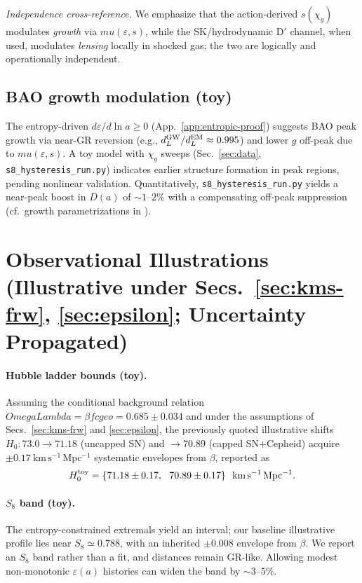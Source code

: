 \documentclass[aps,prd,onecolumn,superscriptaddress,nofootinbib]{revtex4-2}
\def\OmL{OmegaLambda}%
\def\cgeo{cgeo}%
\def\mu{mu}%
\def\Omega_\Lambda{OmegaLambda}%
\providecommand{\OmL}{\Omega_\Lambda}
\providecommand{\cgeo}{c_{\rm geo}}
\providecommand{\be}{\begin{equation}}
\providecommand{\ee}{\end{equation}}
\begin{document}
\noindent\emph{Independence cross-reference.} We emphasize that the action‑derived $s(\chi_g)$ modulates \emph{growth} via $\mu(\varepsilon,s)$, while the SK/hydrodynamic D$'$ channel, when used, modulates \emph{lensing} locally in shocked gas; the two are logically and operationally independent.

\subsection{BAO growth modulation (toy)}
The entropy-driven \(d\varepsilon/d\ln a \geq 0\) (App.~\ref{app:entropic-proof}) suggests BAO peak growth via near-GR reversion (e.g., \(d_L^{\rm GW}/d_L^{\rm EM}\approx 0.995\)) and lower \(g\) off-peak due to \(\mu(\varepsilon,s)\). A toy model with \(\chi_g\) sweeps (Sec.~\ref{sec:data}, \texttt{s8\_hysteresis\_run.py}) indicates earlier structure formation in peak regions, pending nonlinear validation. Quantitatively, \texttt{s8\_hysteresis\_run.py} yields a near-peak boost in \(D(a)\) of \(\sim 1\text{--}2\%\) with a compensating off-peak suppression (cf.\ growth parametrizations in \cite{BelliniSawicki2014}).

\section{Observational Illustrations (Illustrative under Secs.~\ref{sec:kms-frw}, \ref{sec:epsilon}; Uncertainty Propagated)}
\label{sec:obs}

\paragraph{Hubble ladder bounds (toy).}
Assuming the conditional background relation \(\OmL=\beta f\cgeo=0.685\pm 0.034\) and under the assumptions of Secs.~\ref{sec:kms-frw} and \ref{sec:epsilon}, the previously quoted illustrative shifts \(H_0: 73.0\to 71.18\) (uncapped SN) and \(\to 70.89\) (capped SN+Cepheid) acquire \(\pm 0.17~\mathrm{km\,s^{-1}\,Mpc^{-1}}\) systematic envelopes from \(\beta\), reported as
\be
H_0^{\rm toy}=\{71.18\pm 0.17,\ \ 70.89\pm 0.17\}\ \ \mathrm{km\,s^{-1}\,Mpc^{-1}}.
\ee

\paragraph{\(S_8\) band (toy).}
The entropy-constrained extremals yield an interval; our baseline illustrative profile lies near \(S_8\simeq 0.788\), with an inherited \(\pm 0.008\) envelope from \(\beta\). We report an \(S_8\) band rather than a fit, and distances remain GR-like. Allowing modest non-monotonic \(\varepsilon(a)\) histories can widen the band by \(\sim 3\text{--}5\%\).
\end{document}
